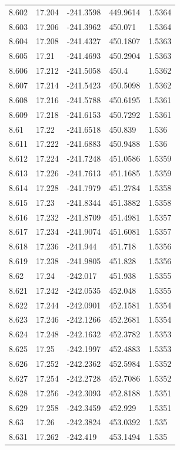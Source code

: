 \begin{tabular}{lllll}
8.602 & 17.204 & -241.3598 & 449.9614 & 1.5364 \\
8.603 & 17.206 & -241.3962 & 450.071 & 1.5364 \\
8.604 & 17.208 & -241.4327 & 450.1807 & 1.5363 \\
8.605 & 17.21 & -241.4693 & 450.2904 & 1.5363 \\
8.606 & 17.212 & -241.5058 & 450.4 & 1.5362 \\
8.607 & 17.214 & -241.5423 & 450.5098 & 1.5362 \\
8.608 & 17.216 & -241.5788 & 450.6195 & 1.5361 \\
8.609 & 17.218 & -241.6153 & 450.7292 & 1.5361 \\
8.61 & 17.22 & -241.6518 & 450.839 & 1.536 \\
8.611 & 17.222 & -241.6883 & 450.9488 & 1.536 \\
8.612 & 17.224 & -241.7248 & 451.0586 & 1.5359 \\
8.613 & 17.226 & -241.7613 & 451.1685 & 1.5359 \\
8.614 & 17.228 & -241.7979 & 451.2784 & 1.5358 \\
8.615 & 17.23 & -241.8344 & 451.3882 & 1.5358 \\
8.616 & 17.232 & -241.8709 & 451.4981 & 1.5357 \\
8.617 & 17.234 & -241.9074 & 451.6081 & 1.5357 \\
8.618 & 17.236 & -241.944 & 451.718 & 1.5356 \\
8.619 & 17.238 & -241.9805 & 451.828 & 1.5356 \\
8.62 & 17.24 & -242.017 & 451.938 & 1.5355 \\
8.621 & 17.242 & -242.0535 & 452.048 & 1.5355 \\
8.622 & 17.244 & -242.0901 & 452.1581 & 1.5354 \\
8.623 & 17.246 & -242.1266 & 452.2681 & 1.5354 \\
8.624 & 17.248 & -242.1632 & 452.3782 & 1.5353 \\
8.625 & 17.25 & -242.1997 & 452.4883 & 1.5353 \\
8.626 & 17.252 & -242.2362 & 452.5984 & 1.5352 \\
8.627 & 17.254 & -242.2728 & 452.7086 & 1.5352 \\
8.628 & 17.256 & -242.3093 & 452.8188 & 1.5351 \\
8.629 & 17.258 & -242.3459 & 452.929 & 1.5351 \\
8.63 & 17.26 & -242.3824 & 453.0392 & 1.535 \\
8.631 & 17.262 & -242.419 & 453.1494 & 1.535 \\

\end{tabular}
